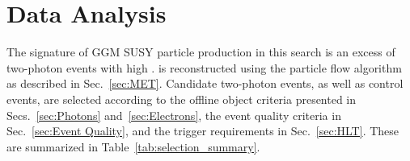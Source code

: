 \documentclass[dissertation.tex]{subfiles}
\begin{document}
\chapter{Data Analysis}
\label{chap:Data Analysis}


The signature of GGM SUSY particle production in this search is an excess of two-photon events with high \MET.  \MET is reconstructed using the particle flow algorithm as described in Sec.~\ref{sec:MET}.  Candidate two-photon events, as well as control events, are selected according to the offline object criteria presented in Secs.~\ref{sec:Photons} and~\ref{sec:Electrons}, the event quality criteria in Sec.~\ref{sec:Event Quality}, and the trigger requirements in Sec.~\ref{sec:HLT}.  These are summarized in Table~\ref{tab:selection_summary}.
\end{document}
